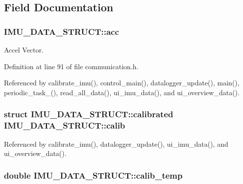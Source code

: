 \subsection{Field Documentation}
\hypertarget{structIMU__DATA__STRUCT_a448f284bf44eb503affda586ad5fa9d2}{
\subsubsection[{acc}]{ I\-M\-U\-\_\-\-D\-A\-T\-A\-\_\-\-S\-T\-R\-U\-C\-T\-::acc}}\label{structIMU__DATA__STRUCT_a448f284bf44eb503affda586ad5fa9d2}


Accel Vector. 



Definition at line 91 of file communication.\-h.



Referenced by calibrate\-\_\-imu(), control\-\_\-main(), datalogger\-\_\-update(), main(), periodic\-\_\-task\-\_(), read\-\_\-all\-\_\-data(), ui\-\_\-imu\-\_\-data(), and ui\-\_\-overview\-\_\-data().

\hypertarget{structIMU__DATA__STRUCT_aeffe3c3c5a7191a5cef16e7aab6c3795}{
\subsubsection[{calib}]{\setlength{\rightskip}{0pt plus 5cm}struct {\bf I\-M\-U\-\_\-\-D\-A\-T\-A\-\_\-\-S\-T\-R\-U\-C\-T\-::calibrated} I\-M\-U\-\_\-\-D\-A\-T\-A\-\_\-\-S\-T\-R\-U\-C\-T\-::calib}}\label{structIMU__DATA__STRUCT_aeffe3c3c5a7191a5cef16e7aab6c3795}


Referenced by calibrate\-\_\-imu(), datalogger\-\_\-update(), ui\-\_\-imu\-\_\-data(), and ui\-\_\-overview\-\_\-data().

\hypertarget{structIMU__DATA__STRUCT_a3553fcee6beba17fe0c7711ac0483875}{
\subsubsection[{calib\-\_\-temp}]{\setlength{\rightskip}{0pt plus 5cm}double I\-M\-U\-\_\-\-D\-A\-T\-A\-\_\-\-S\-T\-R\-U\-C\-T\-::calib\-\_\-temp}}\label{structIMU__DATA__STRUCT_a3553fcee6beba17fe0c7711ac0483875}



